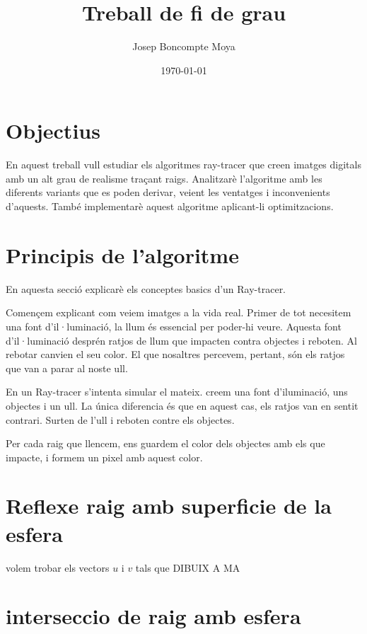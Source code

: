 \documentclass{article}
\title{Treball de fi de grau}
\author{Josep Boncompte Moya}
\date{\today}
\begin{document}
\maketitle

\section{Objectius}
En aquest treball vull estudiar els algoritmes ray-tracer que creen imatges digitals amb un alt grau de realisme traçant raigs.
Analitzarè l'algoritme amb les diferents variants que es poden derivar, veient les ventatges i inconvenients d'aquests. 
També implementarè aquest algoritme aplicant-li optimitzacions.

\section{Principis de l'algoritme}
En aquesta secció explicarè els conceptes basics d'un Ray-tracer.

Començem explicant com veiem imatges a la vida real. Primer de tot necesitem una font d'il·luminació, la llum és essencial per
poder-hi veure. Aquesta font d'il·luminació desprén ratjos de llum que impacten contra objectes i reboten. Al rebotar canvien el
seu color. El que nosaltres percevem, pertant, són els ratjos que van a parar al noste ull.


En un Ray-tracer s'intenta simular el mateix. creem una font d'iluminació, uns objectes i un ull. La única diferencia és que en
aquest cas, els ratjos van en sentit contrari. Surten de l'ull i reboten contre els objectes.




Per cada raig que llencem, ens guardem el color dels objectes amb els que impacte, i formem un pixel amb aquest color.

\section{Reflexe raig amb superficie de la esfera}
volem trobar els vectors $u$ i  $v$ tals que DIBUIX A MA
\section{interseccio de raig amb esfera}
\end{document}
